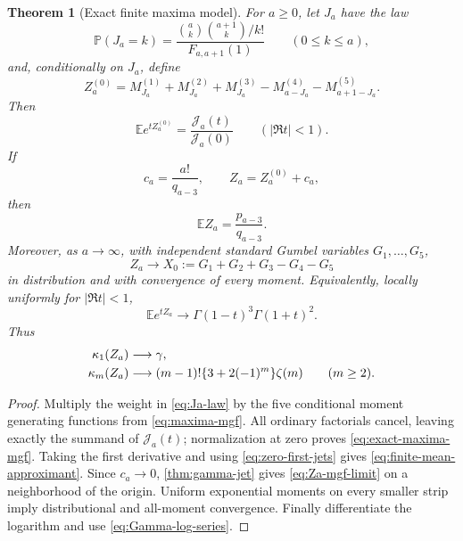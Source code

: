 \documentclass[11pt]{article}
\theoremstyle{keio}
\newtheorem{theorem}{Theorem}[section]
\theoremstyle{definition}
\theoremstyle{remark}
\newcommand{\Prob}{\mathbb P}
\begin{document}
\begin{theorem}[Exact finite maxima model]
\label{thm:ram-probability}
For \(a\ge0\), let \(J_a\) have the law
\begin{equation}\label{eq:Ja-law}
 \Prob(J_a=k)=
 \frac{\binom ak\binom{a+1}k/k!}{F_{a,a+1}(1)}
 \qquad(0\le k\le a),
\end{equation}
and, conditionally on \(J_a\), define
\begin{equation}\label{eq:Za0}
 Z_a^{(0)}=
 M_{J_a}^{(1)}+M_{J_a}^{(2)}+M_{J_a}^{(3)}
 -M_{a-J_a}^{(4)}-M_{a+1-J_a}^{(5)}.
\end{equation}
Then
\begin{equation}\label{eq:exact-maxima-mgf}
 \boxed{\displaystyle
 \mathbb Ee^{tZ_a^{(0)}}
 =\frac{\mathscr J_a(t)}{\mathscr J_a(0)}}
 \qquad(|\Re t|<1).
\end{equation}
If
\begin{equation}\label{eq:Za-correction}
 c_a=\frac{a!}{q_{a-3}},\qquad Z_a=Z_a^{(0)}+c_a,
\end{equation}
then
\begin{equation}\label{eq:finite-mean-approximant}
 \boxed{\displaystyle\mathbb EZ_a=\frac{p_{a-3}}{q_{a-3}}.}
\end{equation}
Moreover, as \(a\to\infty\), with independent standard Gumbel variables
\(G_1,\ldots,G_5\),
\begin{equation}\label{eq:Za-all-moments}
 Z_a\longrightarrow X_0:=G_1+G_2+G_3-G_4-G_5
\end{equation}
in distribution and with convergence of every moment.  Equivalently,
locally uniformly for \(|\Re t|<1\),
\begin{equation}\label{eq:Za-mgf-limit}
 \mathbb Ee^{tZ_a}\longrightarrow
 \Gamma(1-t)^3\Gamma(1+t)^2.
\end{equation}
Thus
\begin{align}
 \kappa_1(Z_a)&\longrightarrow\gamma,\notag\\
 \kappa_m(Z_a)&\longrightarrow
 (m-1)!\{3+2(-1)^m\}\zeta(m)\qquad(m\ge2).
 \label{eq:Za-cumulants}
\end{align}
\end{theorem}

\begin{proof}
Multiply the weight in \eqref{eq:Ja-law} by the five conditional moment
generating functions from \eqref{eq:maxima-mgf}.  All ordinary factorials
cancel, leaving exactly the summand of \(\mathscr J_a(t)\); normalization at
zero proves \eqref{eq:exact-maxima-mgf}.  Taking the first derivative and
using \eqref{eq:zero-first-jets} gives
\eqref{eq:finite-mean-approximant}.  Since \(c_a\to0\),
\cref{thm:gamma-jet} gives \eqref{eq:Za-mgf-limit} on a neighborhood of the
origin.  Uniform exponential moments on every smaller strip imply
distributional and all-moment convergence.  Finally differentiate the
logarithm and use \eqref{eq:Gamma-log-series}.
\end{proof}
\end{document}
